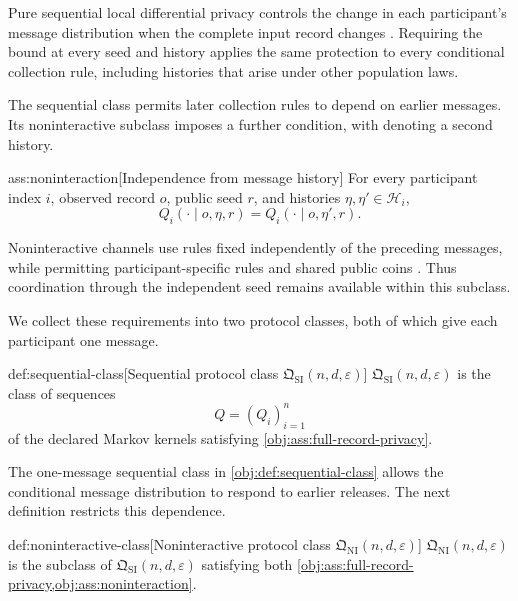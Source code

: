 Pure sequential local differential privacy controls the change in each participant's message distribution when the complete input record changes \citep{DuchiJordanWainwright2018Minimax}. Requiring the bound at every seed and history applies the same protection to every conditional collection rule, including histories that arise under other population laws.

The sequential class permits later collection rules to depend on earlier messages. Its noninteractive subclass imposes a further condition, with  denoting a second history.

\begin{assumptionv}{ass:noninteraction}[Independence from message history]
For every participant index \(i\), observed record \(o\), public seed \(r\), and histories \(\eta,\eta'\in\mathcal H_i\),
\[
Q_i(\cdot\mid o,\eta,r)=Q_i(\cdot\mid o,\eta',r).
\]
\end{assumptionv}

Noninteractive channels use rules fixed independently of the preceding messages, while permitting participant-specific rules and shared public coins \citep{AcharyaCanonneFreitagTyagi2019TestWithoutTrust}. Thus coordination through the independent seed remains available within this subclass.

We collect these requirements into two protocol classes, both of which give each participant one message.

\begin{definitionv}{def:sequential-class}[Sequential protocol class $\mathfrak Q_{\mathrm{SI}}(n,d,\varepsilon)$]
\(\mathfrak Q_{\mathrm{SI}}(n,d,\varepsilon)\) is the class of sequences
\[
Q=(Q_i)_{i=1}^n
\]
of the declared Markov kernels satisfying \cref{obj:ass:full-record-privacy}.
\end{definitionv}

The one-message sequential class  in \cref{obj:def:sequential-class} allows the conditional message distribution to respond to earlier releases. The next definition restricts this dependence.

\begin{definitionv}{def:noninteractive-class}[Noninteractive protocol class $\mathfrak Q_{\mathrm{NI}}(n,d,\varepsilon)$]
\(\mathfrak Q_{\mathrm{NI}}(n,d,\varepsilon)\) is the subclass of \(\mathfrak Q_{\mathrm{SI}}(n,d,\varepsilon)\) satisfying both \cref{obj:ass:full-record-privacy,obj:ass:noninteraction}.
\end{definitionv}

